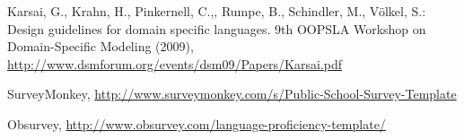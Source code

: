 \documentclass[runningheads]{llncs}
\begin{document}
\begin{thebibliography}{4}

 Karsai, G., Krahn, H., Pinkernell, C.,, Rumpe, B., Schindler, M., Völkel, S.: Design guidelines for domain specific languages. 
9th OOPSLA Workshop on Domain-Specific Modeling (2009), \url{http://www.dsmforum.org/events/dsm09/Papers/Karsai.pdf}

SurveyMonkey, \url{http://www.surveymonkey.com/s/Public-School-Survey-Template}

Obsurvey, \url{http://www.obsurvey.com/language-proficiency-template/}

\end{thebibliography}
\end{document}
